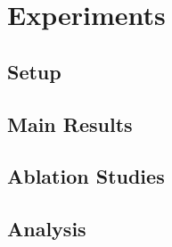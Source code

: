 \section{Experiments}
\label{sec:experiments}

\subsection{Setup}

\subsection{Main Results}

\subsection{Ablation Studies}

\subsection{Analysis}

